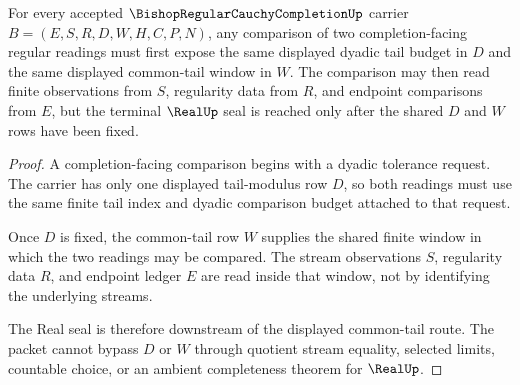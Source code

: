 \begin{theorem}
\label{thm:bishop-regular-cauchy-completion-common-tail-modulus-stability}
For every accepted $\BishopRegularCauchyCompletionUp$ carrier $B=(E,S,R,D,W,H,C,P,N)$, any comparison of two completion-facing regular readings must first expose the same displayed dyadic tail budget in $D$ and the same displayed common-tail window in $W$. The comparison may then read finite observations from $S$, regularity data from $R$, and endpoint comparisons from $E$, but the terminal $\RealUp$ seal is reached only after the shared $D$ and $W$ rows have been fixed.
\end{theorem}
\begin{proof}
A completion-facing comparison begins with a dyadic tolerance request. The carrier has only one displayed tail-modulus row $D$, so both readings must use the same finite tail index and dyadic comparison budget attached to that request.

Once $D$ is fixed, the common-tail row $W$ supplies the shared finite window in which the two readings may be compared. The stream observations $S$, regularity data $R$, and endpoint ledger $E$ are read inside that window, not by identifying the underlying streams.

The Real seal is therefore downstream of the displayed common-tail route. The packet cannot bypass $D$ or $W$ through quotient stream equality, selected limits, countable choice, or an ambient completeness theorem for $\RealUp$.
\end{proof}

